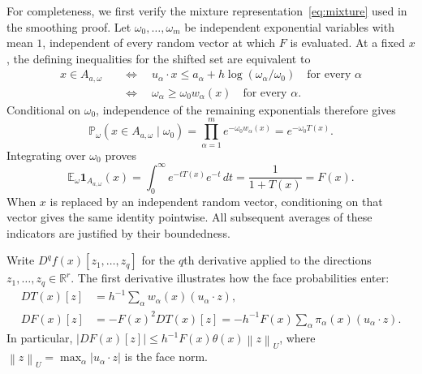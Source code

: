 \documentclass[11pt,letterpaper,twoside,leqno]{article}
\theoremstyle{bookplain}
\theoremstyle{bookremark}
\newcommand{\E}{\mathbb E}
\newcommand{\Pp}{\mathbb P}
\newcommand{\R}{\mathbb R}
\newcommand{\norm}[1]{\left\lVert#1\right\rVert}
\newcommand{\ind}{\mathbf 1}
\begin{document}
For completeness, we first verify the mixture
representation~\eqref{eq:mixture} used in the smoothing proof.
Let $\omega_0,\ldots,\omega_m$ be independent exponential variables
with mean $1$, independent of every random vector at which $F$ is
evaluated. At a fixed $x$, the defining inequalities for the shifted
set are equivalent to
\[
 \begin{aligned}
 x\in A_{a,\omega}
 &\quad\Longleftrightarrow\quad
 u_\alpha\cdot x\le
 a_\alpha+h\log(\omega_\alpha/\omega_0)
       \quad\text{for every }\alpha\\
 &\quad\Longleftrightarrow\quad
 \omega_\alpha\ge\omega_0w_\alpha(x)
       \quad\text{for every }\alpha.
 \end{aligned}
\]
Conditional on $\omega_0$, independence of the remaining exponentials
therefore gives
\[
 \Pp_\omega(x\in A_{a,\omega}\mid\omega_0)
 =\prod_{\alpha=1}^m e^{-\omega_0w_\alpha(x)}
 =e^{-\omega_0T(x)}.
\]
Integrating over $\omega_0$ proves
\[
 \E_\omega\ind_{A_{a,\omega}}(x)
 =\int_0^\infty e^{-tT(x)}e^{-t}\,dt
 =\frac1{1+T(x)}=F(x).
\]
When $x$ is replaced by an independent random vector, conditioning
on that vector gives the same identity pointwise. All subsequent
averages of these indicators are justified by their boundedness.

Write $D^qf(x)[z_1,\ldots,z_q]$ for the $q$th derivative applied
to the directions $z_1,\ldots,z_q\in\R^r$. The first derivative
illustrates how the face probabilities enter:
\[
 \begin{aligned}
 DT(x)[z]&=h^{-1}\sum_\alpha
              w_\alpha(x)(u_\alpha\cdot z),\\
 DF(x)[z]&=-F(x)^2DT(x)[z]
          =-h^{-1}F(x)\sum_\alpha
              \pi_\alpha(x)(u_\alpha\cdot z).
 \end{aligned}
\]
In particular, $|DF(x)[z]|\le h^{-1}F(x)\theta(x)\norm z_U$,
where $\norm z_U=\max_\alpha|u_\alpha\cdot z|$ is the face norm.
\end{document}
